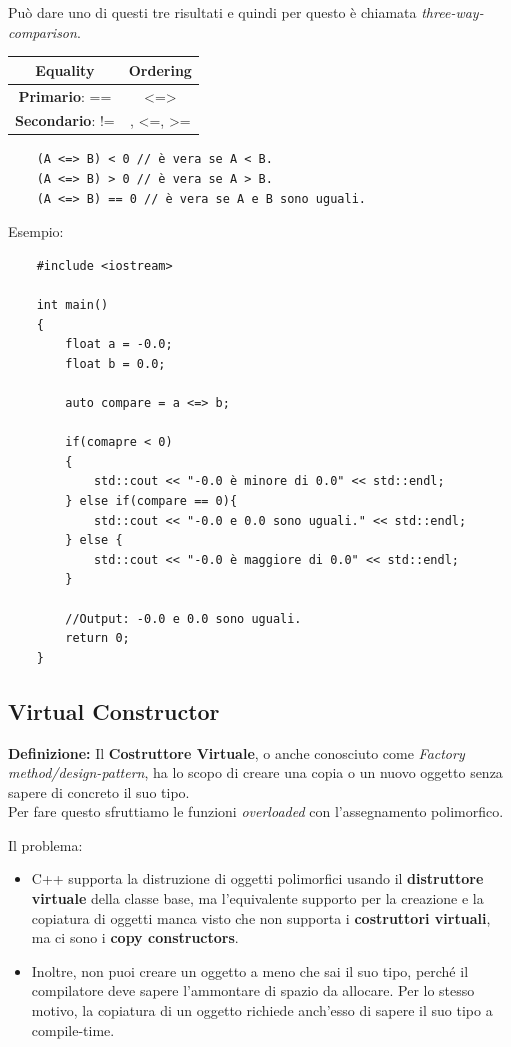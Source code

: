 \textsf{\small Può dare uno di questi tre risultati e quindi per questo è chiamata \emph{three-way-comparison}.} \\

\begin{tabular}{|c|c|}
	\hline
	\textbf{Equality} & \textbf{Ordering} \\
	\hline
	\textsf{\small \textbf{Primario}: ==} & \textsf{\small <=>} \\
	\hline
	\textsf{\small \textbf{Secondario}: !=} & \textsf{\small <, >, <=, >=} \\
	\hline
\end{tabular}

\begin{lstlisting}
	(A <=> B) < 0 // è vera se A < B.
	(A <=> B) > 0 // è vera se A > B.
	(A <=> B) == 0 // è vera se A e B sono uguali.
\end{lstlisting}

\textsf{\small Esempio: } \\

\begin{lstlisting}
	#include <iostream>
	
	int main()
	{
		float a = -0.0;
		float b = 0.0;
		
		auto compare = a <=> b;
		
		if(comapre < 0)
		{
			std::cout << "-0.0 è minore di 0.0" << std::endl;
		} else if(compare == 0){
			std::cout << "-0.0 e 0.0 sono uguali." << std::endl;
		} else {
			std::cout << "-0.0 è maggiore di 0.0" << std::endl;
		}
	
		//Output: -0.0 e 0.0 sono uguali.
		return 0;
	}
\end{lstlisting}

\subsection{Virtual Constructor}

\textsf{\small \textbf{Definizione: } Il \textbf{Costruttore Virtuale}, o anche conosciuto come \emph{Factory method/design-pattern}, ha lo scopo di creare una copia o un nuovo oggetto senza sapere di concreto il suo tipo.} \\

\textsf{\small Per fare questo sfruttiamo le funzioni \emph{overloaded} con l'assegnamento polimorfico.} \break

\textsf{\small Il problema: } \\

\begin{itemize}
	\item \textsf{\small C++ supporta la distruzione di oggetti polimorfici usando il \textbf{distruttore virtuale} della classe base, ma l'equivalente supporto per la creazione e la copiatura di oggetti manca visto che non supporta i \textbf{costruttori virtuali}, ma ci sono i \textbf{copy constructors}.}
	\item \textsf{\small Inoltre, non puoi creare un oggetto a meno che sai il suo tipo, perché il compilatore deve sapere l'ammontare di spazio da allocare. Per lo stesso motivo, la copiatura di un oggetto richiede anch'esso di sapere il suo tipo a compile-time.}
\end{itemize}

